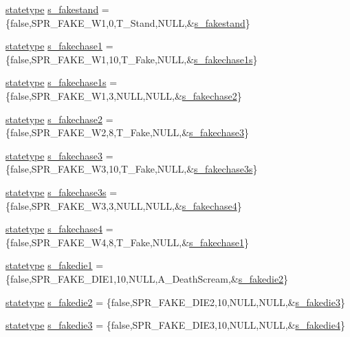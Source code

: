 \begin{DoxyCompactItemize}
\hyperlink{structstatestruct}{statetype} \hyperlink{WL__ACT2_8C_a2fab5217bda18756fcaba79670217a38}{s\_\-fakestand} = \{false,SPR\_\-FAKE\_\-W1,0,T\_\-Stand,NULL,\&\hyperlink{WL__ACT2_8C_a2fab5217bda18756fcaba79670217a38}{s\_\-fakestand}\}
\item 
\hyperlink{structstatestruct}{statetype} \hyperlink{WL__ACT2_8C_ad76ee345c327e96e3564960e280e5889}{s\_\-fakechase1} = \{false,SPR\_\-FAKE\_\-W1,10,T\_\-Fake,NULL,\&\hyperlink{WL__ACT2_8C_abb19fb284c53f87937af5b503ab73804}{s\_\-fakechase1s}\}
\item 
\hyperlink{structstatestruct}{statetype} \hyperlink{WL__ACT2_8C_abb19fb284c53f87937af5b503ab73804}{s\_\-fakechase1s} = \{false,SPR\_\-FAKE\_\-W1,3,NULL,NULL,\&\hyperlink{WL__ACT2_8C_acfa4d54bff5631c2d75f8920fc6a8892}{s\_\-fakechase2}\}
\item 
\hyperlink{structstatestruct}{statetype} \hyperlink{WL__ACT2_8C_acfa4d54bff5631c2d75f8920fc6a8892}{s\_\-fakechase2} = \{false,SPR\_\-FAKE\_\-W2,8,T\_\-Fake,NULL,\&\hyperlink{WL__ACT2_8C_a7c35860a0338dd90fe8bca8d5edfa5fe}{s\_\-fakechase3}\}
\item 
\hyperlink{structstatestruct}{statetype} \hyperlink{WL__ACT2_8C_a7c35860a0338dd90fe8bca8d5edfa5fe}{s\_\-fakechase3} = \{false,SPR\_\-FAKE\_\-W3,10,T\_\-Fake,NULL,\&\hyperlink{WL__ACT2_8C_ad3bf3edfd585c73ed103693b4a859729}{s\_\-fakechase3s}\}
\item 
\hyperlink{structstatestruct}{statetype} \hyperlink{WL__ACT2_8C_ad3bf3edfd585c73ed103693b4a859729}{s\_\-fakechase3s} = \{false,SPR\_\-FAKE\_\-W3,3,NULL,NULL,\&\hyperlink{WL__ACT2_8C_ac705f6abd283bd74f19c7e0b340cf4a7}{s\_\-fakechase4}\}
\item 
\hyperlink{structstatestruct}{statetype} \hyperlink{WL__ACT2_8C_ac705f6abd283bd74f19c7e0b340cf4a7}{s\_\-fakechase4} = \{false,SPR\_\-FAKE\_\-W4,8,T\_\-Fake,NULL,\&\hyperlink{WL__DEF_8H_ad76ee345c327e96e3564960e280e5889}{s\_\-fakechase1}\}
\item 
\hyperlink{structstatestruct}{statetype} \hyperlink{WL__ACT2_8C_ac2dcb48ef7d156d57e236587d00b62f9}{s\_\-fakedie1} = \{false,SPR\_\-FAKE\_\-DIE1,10,NULL,A\_\-DeathScream,\&\hyperlink{WL__ACT2_8C_a10237321111cde1398b8667d7f4af4fb}{s\_\-fakedie2}\}
\item 
\hyperlink{structstatestruct}{statetype} \hyperlink{WL__ACT2_8C_a10237321111cde1398b8667d7f4af4fb}{s\_\-fakedie2} = \{false,SPR\_\-FAKE\_\-DIE2,10,NULL,NULL,\&\hyperlink{WL__ACT2_8C_a9b8baf4f50daeeb1f9d86dc8576ac8ef}{s\_\-fakedie3}\}
\item 
\hyperlink{structstatestruct}{statetype} \hyperlink{WL__ACT2_8C_a9b8baf4f50daeeb1f9d86dc8576ac8ef}{s\_\-fakedie3} = \{false,SPR\_\-FAKE\_\-DIE3,10,NULL,NULL,\&\hyperlink{WL__ACT2_8C_ac4afbd385f447724aeadd9b14a3277aa}{s\_\-fakedie4}\}

\end{DoxyCompactItemize}
